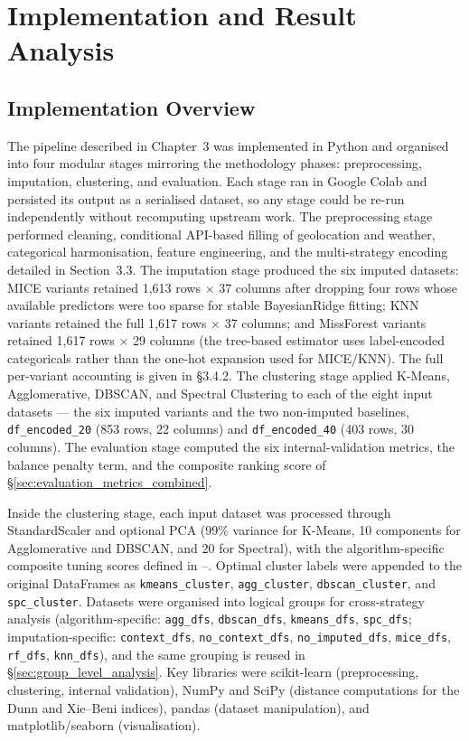 \chapter{Implementation and Result Analysis}

\section{Implementation Overview}

The pipeline described in Chapter~3 was implemented in Python and organised into four modular stages mirroring the methodology phases: preprocessing, imputation, clustering, and evaluation. Each stage ran in Google Colab and persisted its output as a serialised dataset, so any stage could be re-run independently without recomputing upstream work. The preprocessing stage performed cleaning, conditional API-based filling of geolocation and weather, categorical harmonisation, feature engineering, and the multi-strategy encoding detailed in Section~3.3. The imputation stage produced the six imputed datasets: MICE variants retained 1{,}613 rows $\times$ 37 columns after dropping four rows whose available predictors were too sparse for stable BayesianRidge fitting; KNN variants retained the full 1{,}617 rows $\times$ 37 columns; and MissForest variants retained 1{,}617 rows $\times$ 29 columns (the tree-based estimator uses label-encoded categoricals rather than the one-hot expansion used for MICE/KNN). The full per-variant accounting is given in \S3.4.2. The clustering stage applied K-Means, Agglomerative, DBSCAN, and Spectral Clustering to each of the eight input datasets --- the six imputed variants and the two non-imputed baselines, \texttt{df\_encoded\_20} (853 rows, 22 columns) and \texttt{df\_encoded\_40} (403 rows, 30 columns). The evaluation stage computed the six internal-validation metrics, the balance penalty term, and the composite ranking score of \S\ref{sec:evaluation_metrics_combined}.

Inside the clustering stage, each input dataset was processed through StandardScaler and optional PCA (99\% variance for K-Means, 10 components for Agglomerative and DBSCAN, and 20 for Spectral), with the algorithm-specific composite tuning scores defined in --. Optimal cluster labels were appended to the original DataFrames as \texttt{kmeans\_cluster}, \texttt{agg\_cluster}, \texttt{dbscan\_cluster}, and \texttt{spc\_cluster}. Datasets were organised into logical groups for cross-strategy analysis (algorithm-specific: \texttt{agg\_dfs}, \texttt{dbscan\_dfs}, \texttt{kmeans\_dfs}, \texttt{spc\_dfs}; imputation-specific: \texttt{context\_dfs}, \texttt{no\_context\_dfs}, \texttt{no\_imputed\_dfs}, \texttt{mice\_dfs}, \texttt{rf\_dfs}, \texttt{knn\_dfs}), and the same grouping is reused in \S\ref{sec:group_level_analysis}. Key libraries were scikit-learn (preprocessing, clustering, internal validation), NumPy and SciPy (distance computations for the Dunn and Xie--Beni indices), pandas (dataset manipulation), and matplotlib/seaborn (visualisation).

